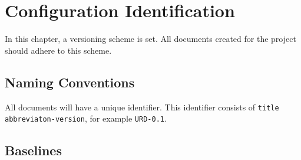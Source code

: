 \chapter{Configuration Identification}
\label{chap:configurationidentification}
In this chapter, a versioning scheme is set. All documents created for the \projectname{} project should adhere to this scheme.

\section{Naming Conventions}
All documents will have a unique identifier. This identifier consists of \texttt{title abbreviaton-version}, for example \texttt{URD-0.1}.

\section{Baselines}